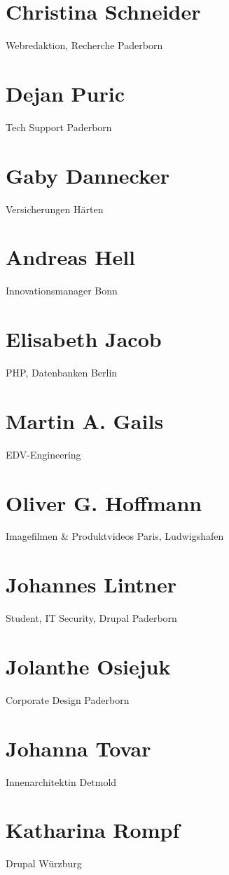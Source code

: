 \begin{appendix}
\section{Christina Schneider}
Webredaktion, Recherche
Paderborn

\section{Dejan Puric}
Tech Support
Paderborn

\section{Gaby Dannecker}
Versicherungen
Härten

\section{Andreas Hell}
Innovationsmanager
Bonn


\section{Elisabeth Jacob}
PHP, Datenbanken
Berlin


\section{Martin A. Gails}
EDV-Engineering


\section{Oliver G. Hoffmann}
Imagefilmen \& Produktvideos
Paris, Ludwigshafen

\section{Johannes Lintner}
Student, IT Security, Drupal
Paderborn

\section{Jolanthe Osiejuk}
Corporate Design
Paderborn

\section{Johanna Tovar}
Innenarchitektin
Detmold

\section{Katharina Rompf}
Drupal
Würzburg


\end{appendix}
